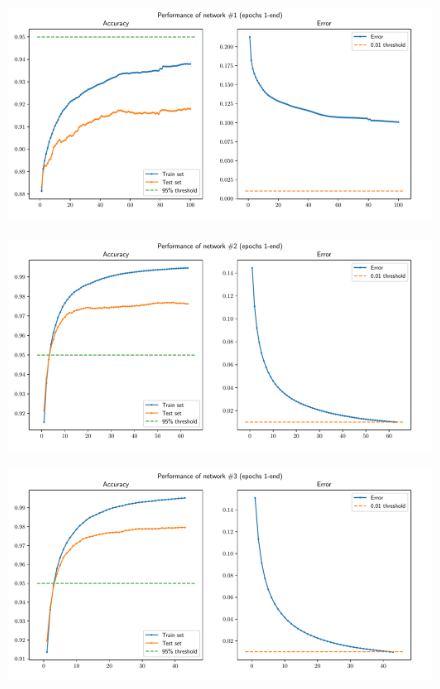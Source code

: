 \documentclass[letterpaper,headings=standardclasses]{scrartcl}
\begin{document}
\begin{figure}[h]
    \centering
    \includegraphics[width=.9\linewidth]{net1.pdf}
    \label{net1}
\end{figure}

\begin{figure}[h]
    \centering
    \includegraphics[width=.9\linewidth]{net2.pdf}
    \label{net2}
\end{figure}

\begin{figure}[p]
    \centering
    \includegraphics[width=.9\linewidth]{net3.pdf}
    \label{net3}
\end{figure}
\end{document}
